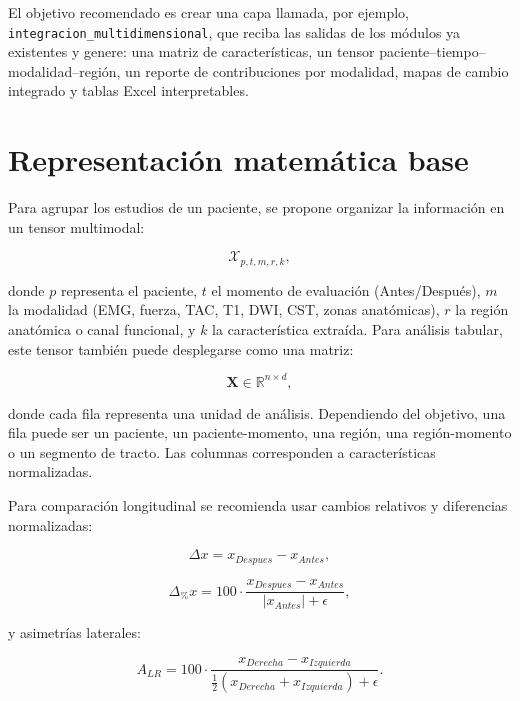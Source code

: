 \documentclass[conference]{IEEEtran}
\begin{document}
El objetivo recomendado es crear una capa llamada, por ejemplo, \texttt{integracion\_multidimensional}, que reciba las salidas de los módulos ya existentes y genere: una matriz de características, un tensor paciente--tiempo--modalidad--región, un reporte de contribuciones por modalidad, mapas de cambio integrado y tablas Excel interpretables.

\section{Representación matemática base}
Para agrupar los estudios de un paciente, se propone organizar la información en un tensor multimodal:

\begin{equation}
\mathcal{X}_{p,t,m,r,k},
\end{equation}

donde $p$ representa el paciente, $t$ el momento de evaluación (Antes/Después), $m$ la modalidad (EMG, fuerza, TAC, T1, DWI, CST, zonas anatómicas), $r$ la región anatómica o canal funcional, y $k$ la característica extraída. Para análisis tabular, este tensor también puede desplegarse como una matriz:

\begin{equation}
\mathbf{X} \in \mathbb{R}^{n \times d},
\end{equation}

donde cada fila representa una unidad de análisis. Dependiendo del objetivo, una fila puede ser un paciente, un paciente-momento, una región, una región-momento o un segmento de tracto. Las columnas corresponden a características normalizadas.

Para comparación longitudinal se recomienda usar cambios relativos y diferencias normalizadas:

\begin{equation}
\Delta x = x_{Despues} - x_{Antes},
\end{equation}

\begin{equation}
\Delta_{\%}x = 100 \cdot \frac{x_{Despues} - x_{Antes}}{|x_{Antes}| + \epsilon},
\end{equation}

y asimetrías laterales:

\begin{equation}
A_{LR} = 100 \cdot \frac{x_{Derecha} - x_{Izquierda}}{\frac{1}{2}(x_{Derecha}+x_{Izquierda}) + \epsilon}.
\end{equation}
\end{document}
